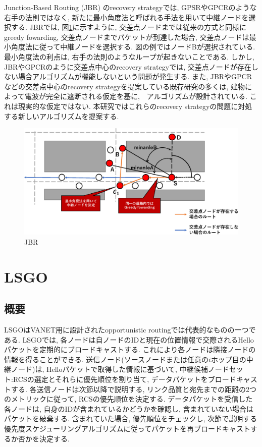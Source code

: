 \documentclass[10pt]{jreport}
\begin{document}
Junction-Based Routing (JBR) \cite{JBR}のrecovery strategyでは, GPSRやGPCRのような右手の法則ではなく, 新たに最小角度法と呼ばれる手法を用いて中継ノードを選択する. JBRでは, 図\ref{fig:JBR}に示すように, 交差点ノードまでは従来の方式と同様にgreedy fowarding, 交差点ノードまでパケットが到達した場合, 交差点ノードは最小角度法に従って中継ノードを選択する. 図の例ではノードBが選択されている. 最小角度法の利点は, 右手の法則のようなループが起きないことである. 
しかし, JBRやGPCRのように交差点中心のrecovery strategyでは, 交差点ノードが存在しない場合アルゴリズムが機能しないという問題が発生する. また, JBRやGPCRなどの交差点中心のrecovery strategyを提案している既存研究の多くは, 建物によって電波が完全に遮断される仮定を基に,　アルゴリズムが設計されている. これは現実的な仮定ではない. 
本研究ではこれらのrecovery strategyの問題に対処する新しいアルゴリズムを提案する. 

\begin{figure}[!ht]
	\centering
	\includegraphics[width=140mm]{figures/JBR.eps}
	\caption{JBR}
	\label{fig:JBR}
\end{figure}



\chapter{LSGO}
\label{LSGO}
\section{概要}
LSGOはVANET用に設計されたopportunistic routingでは代表的なものの一つである.
LSGOでは, 各ノードは自ノードのIDと現在の位置情報で交際されるHelloパケットを定期的にブロードキャストする. これにより各ノードは隣接ノードの情報を得ることができる.
送信ノード(ソースノードまたは任意の$i$ホップ目の中継ノード)は, Helloパケットで取得した情報に基づいて, 中継候補ノードセット:RCSの選定とそれらに優先順位を割り当て, データパケットをブロードキャストする. 各送信ノードは次節以降で説明する, リンク品質と宛先までの距離の2つのメトリックに従って, RCSの優先順位を決定する. データパケットを受信した各ノードは, 自身のIDが含まれているかどうかを確認し, 含まれていない場合はパケットを破棄する. 含まれていた場合, 優先順位をチェックし, 次節で説明する優先度スケジューリングアルゴリズムに従ってパケットを再ブロードキャストするか否かを決定する.
\end{document}
